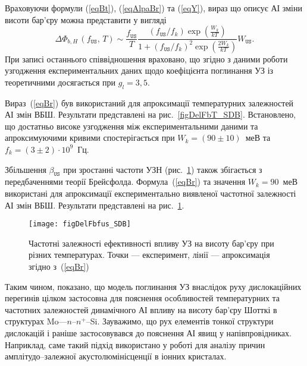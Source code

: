 Враховуючи формули (\ref{eqBt}), (\ref{eqAlpaBr}) та (\ref{eqY}),
вираз що описує АІ зміни висоти бар'єру можна представити у вигляді
\begin{equation}
\label{eqBr}
\Delta\Phi_{b,H}\,(f_\mathtt{US},\,T)\sim\frac{f_\mathtt{US}}{T}\frac{(f_\mathtt{US}/{f_k})\exp\left(\frac{W_k}{kT}\right)}
{1+(f_\mathtt{US}/{f_k})^2\exp\left(\frac{2W_k}{kT}\right)}W_\mathtt{US}.
\end{equation}
При записі останнього співвідношення враховано, що згідно з даними
 роботи \cite{Olikh:UPJ2014} узгодження експериментальних даних щодо коефіцієнта поглинання УЗ із теоретичними
досягається при $g_l=3,5$.



Вираз~(\ref{eqBr}) був використаний для апроксимації температурних залежностей АІ змін ВБШ.
Результати представлені на рис.~\ref{figDelFbT_SDB}.
Встановлено, що достатньо високе узгодження між експериментальними даними та апроксимуючими кривими спостерігається
при  $W_k=(90\pm10)$~меВ та $f_k=(3\pm2)\cdot10^9$~Гц.

Збільшення $\beta_\mathtt{US}$ при зростанні частоти УЗН (рис.~\ref{figDelFbfus_SDB}) також збігається
з передбаченнями теорії Брейсфолда.
Формула~(\ref{eqBr}) та значення $W_k=90$~меВ використані для апроксимації експериментально виявленої частотної залежності АІ змін ВБШ.
Результати представлені на рис.~\ref{figDelFbfus_SDB}.


\begin{figure}
\center
\texttt{[image: figDelFbfus\_SDB]}
\caption{\label{figDelFbfus_SDB}
Частотні залежності ефективності впливу УЗ на висоту бар'єру при різних температурах.
Точки --- експеримент,
лінії --- апроксимація згідно з~(\ref{eqBr})
}%
\end{figure}


Таким чином, показано, що модель поглинання УЗ внаслідок руху дислокаційних перегинів цілком застосовна
для пояснення особливостей температурних та частотних залежностей динамічного АІ впливу на висоту бар'єру Шотткі в структурах Mo---$n$--$n^+$--Si.
Зауважимо, що рух елементів тонкої структури дислокацій і раніше застосовувався до
пояснення АІ явищ у напівпровідниках.
Наприклад, саме такий підхід використано у роботі \cite{Loktev} для аналізу причин амплітудо--залежної акустолюмінісценції в іонних кристалах.



